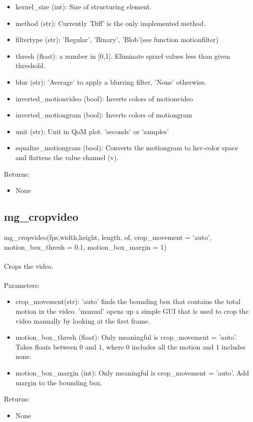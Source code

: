 \documentclass[9pt]{extarticle}
\begin{document}
    \begin{itemize}
    \item [] kernel\_size (int): Size of structuring element.
   \item [] method (str): Currently 'Diff' is the only implemented method. 
    \item [] filtertype (str): 'Regular', 'Binary', 'Blob'(see function motionfilter) 
    \item [] thresh (float): a number in [0,1]. Eliminate spixel values less than given threshold.
    \item [] blur (str): 'Average' to apply a blurring filter, 'None' otherwise.
    \item [] inverted\_motionvideo (bool): Inverts colors of motionvideo
    \item [] inverted\_motiongram (bool): Inverts colors of motiongram
    \item [] unit (str): Unit in QoM plot. 'seconds' or 'samples'
    \item [] equalize\_motiongram (bool): Converts the motiongram to hsv-color space and flattens the value channel (v).
    \end{itemize}
    Returns:
    \begin{itemize}
    \item [] None
    \end{itemize}


\subsection{mg\_cropvideo}

    mg\_cropvideo(fps,width,height, length, of, crop\_movement = 'auto', motion\_box\_thresh = 0.1, motion\_box\_margin = 1)
    \\\\
	Crops the video.\\\\
Parameters:
        \begin{itemize}
		\item [] crop\_movement(str): 'auto' finds the bounding box that contains the total motion in the video. 'manual' opens up a simple GUI that is used to crop the video manually by looking at the first frame.

		\item [] motion\_box\_thresh (float): Only meaningful is crop\_movement = 'auto'. Takes floats between 0 and 1, where 0 includes all the motion and 1 includes none.
		
		\item [] motion\_box\_margin (int): Only meaningful is crop\_movement = 'auto'. Add margin to the bounding box.
        \end{itemize}
	Returns:
    \begin{itemize}
	   \item [] None
    \end{itemize}
\end{document}
